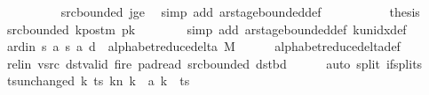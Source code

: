 \begin{isabellebody}
\ \ \ \ \ \ \ \ \isamarkupfalse%
\ src{\isacharunderscore}{\kern0pt}bounded\ jge\ \isamarkupfalse%
\ {\isacharparenleft}{\kern0pt}simp\ add{\isacharcolon}{\kern0pt}\ ar{\isacharunderscore}{\kern0pt}stage{\isacharunderscore}{\kern0pt}bounded{\isacharunderscore}{\kern0pt}def{\isacharparenright}{\kern0pt}\isanewline
\ \ \ \ \isamarkupfalse%
\isanewline
\ \ \ \ \isamarkupfalse%
\ {\isacharquery}{\kern0pt}thesis\ \isamarkupfalse%
\ src{\isacharunderscore}{\kern0pt}bounded\ kpos{\isacharunderscore}{\kern0pt}tm\ pk\isanewline
\ \ \ \ \ \ \isamarkupfalse%
\ {\isacharparenleft}{\kern0pt}simp\ add{\isacharcolon}{\kern0pt}\ ar{\isacharunderscore}{\kern0pt}stage{\isacharunderscore}{\kern0pt}bounded{\isacharunderscore}{\kern0pt}def\ k{\isacharunderscore}{\kern0pt}unidx{\isacharunderscore}{\kern0pt}def{\isacharparenright}{\kern0pt}\isanewline
\ \ \isamarkupfalse%
\isanewline
\ \ \isamarkupfalse%
\ ard{\isacharunderscore}{\kern0pt}in{\isacharcolon}{\kern0pt}\ {\isachardoublequoteopen}{\isacharparenleft}{\kern0pt}{\isacharquery}{\kern0pt}s{\isacharcomma}{\kern0pt}\ {\isacharquery}{\kern0pt}a{\isacharcomma}{\kern0pt}\ {\isacharquery}{\kern0pt}s{\isacharprime}{\kern0pt}{\isacharcomma}{\kern0pt}\ {\isacharquery}{\kern0pt}a{\isacharcomma}{\kern0pt}\ {\isacharquery}{\kern0pt}d{\isacharparenright}{\kern0pt}\ {\isasymin}\ alphabet{\isacharunderscore}{\kern0pt}reduce{\isacharunderscore}{\kern0pt}delta\ M{\isachardoublequoteclose}\isanewline
\ \ \ \ \isamarkupfalse%
\ alphabet{\isacharunderscore}{\kern0pt}reduce{\isacharunderscore}{\kern0pt}delta{\isacharunderscore}{\kern0pt}def\isanewline
\ \ \ \ \isamarkupfalse%
\ rel{\isacharunderscore}{\kern0pt}in\ vsrc\ dst{\isacharunderscore}{\kern0pt}valid\ fire{\isacharprime}{\kern0pt}\ pad{\isacharunderscore}{\kern0pt}read\ src{\isacharunderscore}{\kern0pt}bounded\ dst{\isacharunderscore}{\kern0pt}bd\isanewline
\ \ \ \ \isamarkupfalse%
\ {\isacharparenleft}{\kern0pt}auto\ split{\isacharcolon}{\kern0pt}\ if{\isacharunderscore}{\kern0pt}splits{\isacharparenright}{\kern0pt}\isanewline
\ \ \isamarkupfalse%
\ ts{\isacharunderscore}{\kern0pt}unchanged{\isacharcolon}{\kern0pt}\ {\isachardoublequoteopen}{\isacharparenleft}{\kern0pt}{\isasymlambda}k{\isachardot}{\kern0pt}\ {\isacharparenleft}{\kern0pt}ts\ k{\isacharparenright}{\kern0pt}{\isacharparenleft}{\kern0pt}n\ k\ {\isacharcolon}{\kern0pt}{\isacharequal}{\kern0pt}\ {\isacharquery}{\kern0pt}a\ k{\isacharparenright}{\kern0pt}{\isacharparenright}{\kern0pt}\ {\isacharequal}{\kern0pt}\ ts{\isachardoublequoteclose}\ \isamarkupfalse%

\end{isabellebody}
